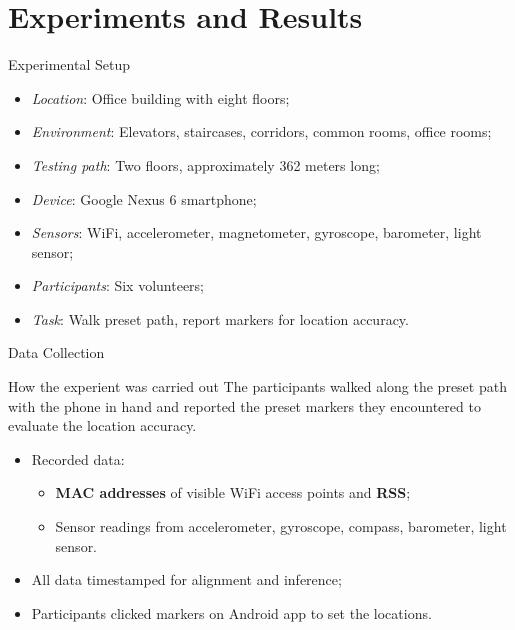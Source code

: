 \section[Results]{Experiments and Results}
\begin{frame}{Experimental Setup}
    \begin{itemize}
        \item \textit{Location}: Office building with eight floors;
        \item \textit{Environment}: Elevators, staircases, corridors, common rooms, office rooms;
        \item \textit{Testing path}: Two floors, approximately 362 meters long;
        \item \textit{Device}: Google Nexus 6 smartphone;
        \item \textit{Sensors}: WiFi, accelerometer, magnetometer, gyroscope, barometer, light sensor;
        \item \textit{Participants}: Six volunteers;
        \item \textit{Task}: Walk preset path, report markers for location accuracy.
    \end{itemize}
\end{frame}

\begin{frame}{Data Collection}
    \begin{block}{How the experient was carried out}
        The participants walked along the preset path with the phone in hand and reported the preset markers they encountered to evaluate the location accuracy.
    \end{block}
    \begin{itemize}
        \item Recorded data:
            \begin{itemize}
                \item \textbf{MAC addresses} of visible WiFi access points and \textbf{RSS};
                \item Sensor readings from accelerometer, gyroscope, compass, barometer, light sensor.
            \end{itemize}
        \item All data timestamped for alignment and inference;
        \item Participants clicked markers on Android app to set the locations.
    \end{itemize}
\end{frame}


